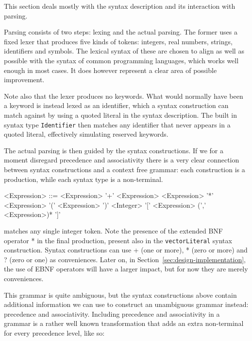 \documentclass{kththesis}
\begin{document}
This section deals mostly with the syntax description and its interaction with parsing.

Parsing consists of two steps: lexing and the actual parsing. The former uses a fixed lexer that produces five kinds of tokens: integers, real numbers, strings, identifiers and symbols. The lexical syntax of these are chosen to align as well as possible with the syntax of common programming languages, which works well enough in most cases. It does however represent a clear area of possible improvement.

Note also that the lexer produces no keywords. What would normally have been a keyword is instead lexed as an identifier, which a syntax construction can match against by using a quoted literal in the syntax description. The built in syntax type \texttt{Identifier} then matches any identifier that never appears in a quoted literal, effectively simulating reserved keywords.

The actual parsing is then guided by the syntax constructions. If we for a moment disregard precedence and associativity there is a very clear connection between syntax constructions and a context free grammar: each construction is a production, while each syntax type is a non-terminal.

\setlength{\grammarindent}{8em}
\begin{grammar}
<Expression> ::= <Expression> '+' <Expression>
  \alt <Expression> '*' <Expression>
  \alt '(' <Expression> ')'
  \alt <Integer>
  \alt '[' <Expression> (',' <Expression>)* ']'
\end{grammar}

 matches any single integer token. Note the presence of the extended BNF operator * in the final production, present also in the \texttt{vectorLiteral} syntax construction. Syntax constructions can use + (one or more), * (zero or more) and ? (zero or one) as conveniences. Later on, in Section~\ref{sec:design-implementation}, the use of EBNF operators will have a larger impact, but for now they are merely conveniences.

This grammar is quite ambiguous, but the syntax constructions above contain additional information we can use to construct an unambiguous grammar instead: precedence and associativity. Including precedence and associativity in a grammar is a rather well known transformation that adds an extra non-terminal for every precedence level, like so:
\end{document}
